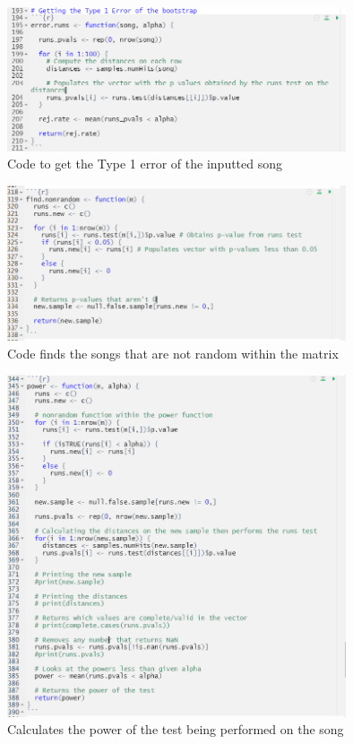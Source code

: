 \documentclass[12pt, letterpaper]{article}
\begin{document}
\begin{figure}[!hb]
\centering
\includegraphics[width=10cm]{Type1ErrCode.png}
\caption{Code to get the Type 1 error of the inputted song}
\label{fig: Type 1 Error Code}
\end{figure}

\begin{figure}[!hb]
\centering
\includegraphics[width=10cm]{FindNonRandomCode.png}
\caption{Code finds the songs that are not random within the matrix}
\label{fig: Find Nonrandom Songs Code}
\end{figure}

\begin{figure}[!hb]
\centering
\includegraphics[width=10cm]{PowerCode.png}
\caption{Calculates the power of the test being performed on the song}
\label{fig: Power Code}
\end{figure}
\end{document}

